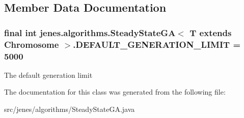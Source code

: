\subsection{Member Data Documentation}
\hypertarget{classjenes_1_1algorithms_1_1_steady_state_g_a_3_01_t_01extends_01_chromosome_01_4_d510a7e4a856de7b2c9d021b2f66a5ac}{
\subsubsection[DEFAULT\_\-GENERATION\_\-LIMIT]{\setlength{\rightskip}{0pt plus 5cm}final int jenes.algorithms.SteadyStateGA$<$ T extends Chromosome $>$.{\bf DEFAULT\_\-GENERATION\_\-LIMIT} = 5000}}
\label{classjenes_1_1algorithms_1_1_steady_state_g_a_3_01_t_01extends_01_chromosome_01_4_d510a7e4a856de7b2c9d021b2f66a5ac}


The default generation limit 

The documentation for this class was generated from the following file:\begin{CompactItemize}
\item 
src/jenes/algorithms/SteadyStateGA.java\end{CompactItemize}
